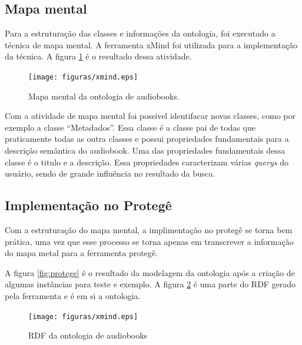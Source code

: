 \subsection{Mapa mental}

Para a estruturação das classes e informações da ontologia, foi executado a técnica de mapa mental. A ferramenta xMind foi utilizada para a implementação da técnica. A figura \ref{fig:xmind} é o resultado dessa atividade.

\begin{figure}[H]
  \centering
    \texttt{[image: figuras/xmind.eps]}
  \caption{Mapa mental da ontologia de audiobooks.}
  \label{fig:xmind}
\end{figure}

Com a atividade de mapa mental foi possivel identifacar novas classes, como por exemplo a classe “Metadados”. Essa classe é a classe pai de todas que praticamente todas as outra classes e possui propriedades fundamentais para a descrição semântica do audiobook. Uma das propriedades fundamentais dessa classe é o titulo e a descrição. Essa propriedades caracterizam várias \textit{querys} do usuário, sendo de grande influência no resultado da busca.

\subsection{Implementação no Protegê}

Com a estruturação do mapa mental, a implimentação no protegê se torna bem prática, uma vez que esse processo se torna apenas em transcrever a informação do mapa metal para a ferramenta protegê. 

A figura \ref{fig:protege} é o resultado da modelagem da ontologia após a criação de algumas instâncias para teste e exemplo. A figura \ref{fig:rdf} é uma parte do RDF gerado pela ferramenta e é em si a ontologia.

\begin{figure}[H]
  \centering
    \texttt{[image: figuras/xmind.eps]}
  \caption{RDF da ontologia de audiobooks}
  \label{fig:rdf}
\end{figure}

